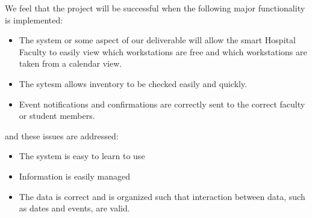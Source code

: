 \begin{flushleft}
We feel that the project will be successful when the following major functionality is implemented: 
\end{flushleft}
\begin{itemize}
	\item The system or some aspect of our deliverable will allow the smart Hospital Faculty to easily view which workstations are free and which workstations are taken from a calendar view.
	\item The sytesm allows inventory to be checked easily and quickly.
	\item Event notifications and confirmations are correctly sent to the correct faculty or student members.
\end{itemize}
\begin{flushleft}
and these issues are addressed:
\end{flushleft}
\begin{itemize}
	\item The system is easy to learn to use
	\item Information is easily managed 
	\item The data is correct and is organized such that interaction between data, such as dates and events, are valid.
\end{itemize} 
	 
